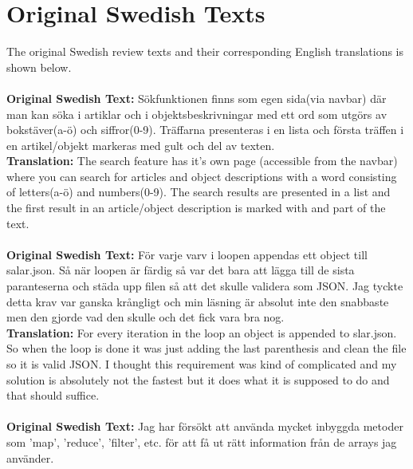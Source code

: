 \documentclass[twoside,twocolumn,a4paper,11pt,english]{article}
\begin{document}




\newpage

\appendix

\section{Original Swedish Texts} \label{app:original}

The original Swedish review texts and their corresponding English translations is shown below.
\\
\\
\textbf{Original Swedish Text:} Sökfunktionen finns som egen sida(via navbar) där man kan söka i artiklar och i objektsbeskrivningar med ett ord som utgörs av bokstäver(a-ö) och siffror(0-9). Träffarna presenteras i en lista och första träffen i en artikel/objekt markeras med gult och del av texten.
\\
\textbf{Translation:} The search feature has it's own page (accessible from the navbar) where you can search for articles and object descriptions with a word consisting of letters(a-ö) and numbers(0-9). The search results are presented in a list and the first result in an article/object description is marked with and part of the text.
\\
\\
\textbf{Original Swedish Text:} För varje varv i loopen appendas ett object till salar.json. Så när loopen är färdig så var det bara att lägga till de sista paranteserna och städa upp filen så att det skulle validera som JSON. Jag tyckte detta krav var ganska krångligt och min läsning är absolut inte den snabbaste men den gjorde vad den skulle och det fick vara bra nog.
\\
\textbf{Translation:} For every iteration in the loop an object is appended to slar.json. So when the loop is done it was just adding the last parenthesis and clean the file so it is valid JSON. I thought this requirement was kind of complicated and my solution is absolutely not the fastest but it does what it is supposed to do and that should suffice.
\\
\\
\textbf{Original Swedish Text:} Jag har försökt att använda mycket inbyggda metoder som 'map', 'reduce', 'filter', etc. för att få ut rätt information från de arrays jag använder.
\end{document}
